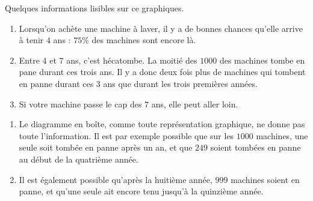 \begin{example}
    Quelques informations lisibles sur ce graphiques.
    \begin{enumerate}
        \item
            Lorsqu'on achète une machine à laver, il y a de bonnes chances qu'elle arrive à tenir \( 4\) ans : \( 75\%\) des machines sont encore là.
        \item
            Entre \( 4\) et \( 7\) ans, c'est hécatombe. La moitié des \( 1000\) des machines tombe en pane durant ces trois ans. Il y a donc deux fois plus de machines qui tombent en panne durant ces 3 ans que durant les trois premières années.
        \item
            Si votre machine passe le cap des \( 7\) ans, elle peut aller loin.
    \end{enumerate}

    \begin{remark}
        \begin{enumerate}
            \item
                Le diagramme en boîte, comme toute représentation graphique, ne donne pas toute l'information. Il est par exemple possible que sur les \( 1000\) machines, une seule soit tombée en panne après un an, et que $249$ soient tombées en panne au début de la quatrième année.
            \item
                Il est également possible qu'après la huitième année, \( 999\) machines soient en panne, et qu'une seule ait encore tenu jusqu'à la quinzième année.
        \end{enumerate}
    \end{remark}
\end{example}


